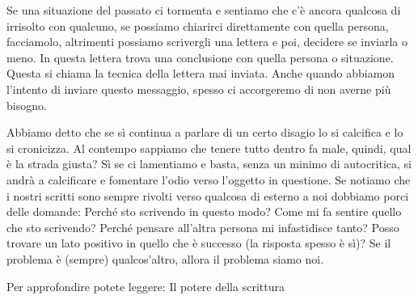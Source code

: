 \documentclass[12pt]{book} %
\begin{document}
Se una situazione del passato ci tormenta e sentiamo che c'è ancora qualcosa di irrisolto con qualcuno, se possiamo
chiarirci direttamente con quella persona, facciamolo, altrimenti possiamo scrivergli una lettera e poi, decidere se
inviarla o meno. In questa lettera trova una conclusione con quella persona o situazione.
Questa si chiama la tecnica della lettera mai inviata. Anche quando abbiamon l'intento di inviare questo messaggio, spesso ci accorgeremo di non averne più bisogno.

Abbiamo detto che se sì continua a parlare di un certo disagio lo si calcifica e lo si cronicizza. Al contempo sappiamo
che tenere tutto dentro fa male, quindi, qual è la strada giusta? Sì se ci lamentiamo e basta, senza un minimo di
autocritica, si andrà a calcificare e fomentare l'odio verso l'oggetto in questione. Se notiamo
che i nostri scritti sono sempre rivolti verso qualcosa di esterno a noi dobbiamo porci delle domande: Perché sto
scrivendo in questo modo? Come mi fa sentire quello che sto scrivendo? Perché pensare all'altra
persona mi infastidisce tanto? Posso trovare un lato positivo in quello che è successo (la risposta spesso è sì)?
Se il problema è (sempre) qualcos'altro, allora il problema siamo noi.

Per approfondire potete leggere: Il potere della
scrittura


\bigskip
\end{document}
